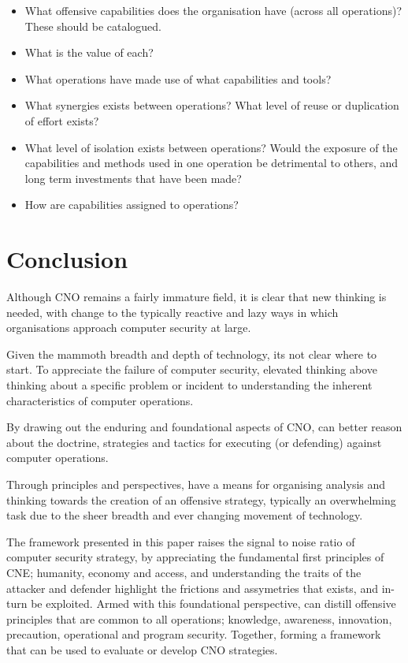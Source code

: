 \documentclass[11pt]{report}
\begin{document}
\begin{itemize}
	\item What offensive capabilities does the organisation have (across all operations)? These should be catalogued.
	\item What is the value of each?
	\item What operations have made use of what capabilities and tools?
	\item What synergies exists between operations? What level of reuse or duplication of effort exists?
	\item What level of isolation exists between operations? Would the exposure of the capabilities and methods used in one operation be detrimental to others, and long term investments that have been made?
	\item How are capabilities assigned to operations?
\end{itemize}


\section{Conclusion}

Although CNO remains a fairly immature field, it is clear that new thinking is needed, with change to the typically reactive and lazy ways in which organisations approach computer security at large.

Given the mammoth breadth and depth of technology, its not clear where to start. To appreciate the failure of computer security, elevated thinking above thinking about a specific problem or incident to understanding the inherent characteristics of computer operations.

By drawing out the enduring and foundational aspects of CNO, can better reason about the doctrine, strategies and tactics for executing (or defending) against computer operations.

Through principles and perspectives, have a means for organising analysis and thinking towards the creation of an offensive strategy, typically an overwhelming task due to the sheer breadth and ever changing movement of technology.

The framework presented in this paper raises the signal to noise ratio of computer security strategy, by appreciating the fundamental first principles of CNE; humanity, economy and access, and understanding the traits of the attacker and defender highlight the frictions and assymetries that exists, and in-turn be exploited. Armed with this foundational perspective, can distill offensive principles that are common to all operations; knowledge, awareness, innovation, precaution, operational and program security. Together, forming a framework that can be used to evaluate or develop CNO strategies.
\end{document}
